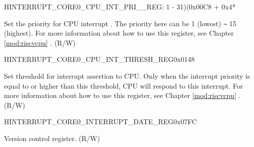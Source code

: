 \begin{register}{H}{INTERRUPT\_CORE0\_CPU\_INT\_PRI\_\_REG}{: 1 - 31)(0x00C8 + 0x4*}\label{regdesc:INTERRUPTCORE0CPUINTPRI0REG}
%
%
\regnewline%
\begin{regdesc}\begin{reglist}
\label{fielddesc:INTERRUPTCORE0CPUPRI0MAP}\item [INTERRUPT\_CORE0\_CPU\_PRI\_\regindex{n}\_MAP] Set the priority for CPU interrupt . The priority here can be 1 (lowest) \verb+~+ 15 (highest). For more information about how to use this register, see Chapter \ref{mod:riscvcpu} \textit{}. (R/W)
\end{reglist}\end{regdesc}
\end{register}

\begin{register}{H}{INTERRUPT\_CORE0\_CPU\_INT\_THRESH\_REG}{0x0148}\label{regdesc:INTERRUPTCORE0CPUINTTHRESHREG}
%
%
\regnewline%
\begin{regdesc}\begin{reglist}
\label{fielddesc:INTERRUPTCORE0CPUINTTHRESH}\item [INTERRUPT\_CORE0\_CPU\_INT\_THRESH] Set threshold for interrupt assertion to CPU. Only when the interrupt priority is equal to or higher than this threshold, CPU will respond to this interrupt. For more information about how to use this register, see Chapter \ref{mod:riscvcpu} \textit{}. (R/W)
\end{reglist}\end{regdesc}
\end{register}


\begin{register}{H}{INTERRUPT\_CORE0\_INTERRUPT\_DATE\_REG}{0x07FC}\label{regdesc:INTERRUPTCORE0INTERRUPTDATEREG}
%
%
\regnewline%
\begin{regdesc}\begin{reglist}
\label{fielddesc:INTERRUPTCORE0INTERRUPTDATE}\item [INTERRUPT\_CORE0\_INTERRUPT\_DATE] Version control register. (R/W)
\end{reglist}\end{regdesc}
\end{register}

